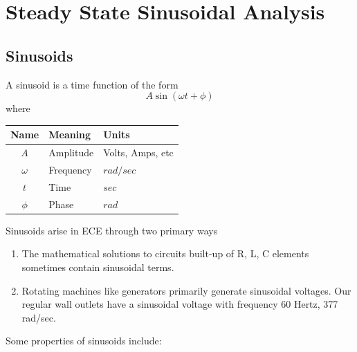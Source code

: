 
\chapter{Steady State Sinusoidal Analysis}


\section{Sinusoids}

A sinusoid is a time function of the form
\[
  A \sin(\omega t + \phi)
\]
where


\vspace{0.2in}
\begin{tabular}{c|l|l}
Name    & Meaning  & Units\\\hline
$A$   &  Amplitude  &  Volts, Amps, etc \\
$\omega$   & Frequency  & $rad/sec$ \\
$t$     & Time  & $sec$  \\
$\phi$  & Phase & $rad$  \\
\end{tabular}

\vspace{0.2in}
Sinusoids arise in ECE through two primary ways
\begin{enumerate}

\item The mathematical solutions to circuits built-up of R, L, C elements sometimes
contain sinusoidal terms.

\item Rotating machines like generators primarily generate sinusoidal voltages.   Our regular wall outlets
have a sinusoidal voltage with frequency 60 Hertz, 377 rad/sec.

\end{enumerate}


Some properties of sinusoids include:


